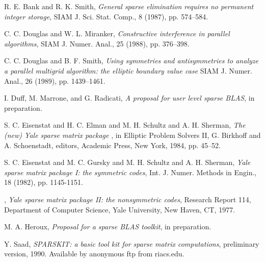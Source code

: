  

\begin{thebibliography}{99}
 
  R. E. Bank and R. K. Smith,
  {\em General sparse elimination requires no permanent integer storage},
  SIAM J. Sci. Stat. Comp., 8 (1987), pp. 574--584.
 
  C. C. Douglas and W. L. Miranker,
  {\em Constructive interference in parallel algorithms},
  SIAM J. Numer. Anal., 25 (1988), pp. 376--398.
 
  C. C. Douglas and B. F. Smith,
  {\em Using symmetries and antisymmetries to analyze a parallel
       multigrid algorithm: the elliptic boundary value case}
  SIAM J. Numer. Anal., 26 (1989), pp. 1439--1461.
 
  I. Duff, M. Marrone, and G. Radicati,
  {\em A proposal for user level sparse {BLAS}},
  in preparation.

  S. C. Eisenstat and H. C. Elman and M. H. Schultz and A. H. Sherman,
  {\em The (new) Yale sparse matrix package },
  in Elliptic Problem Solvers II, G. Birkhoff and A. Schoenstadt, editors,
  Academic Press, New York, 1984, pp. 45--52.

  S. C. Eisenstat and M. C. Gursky and M. H. Schultz and A. H. Sherman,
  {\em Yale sparse matrix package I:  the symmetric codes},
  Int. J. Numer. Methods in Engin., 18 (1982), pp. 1145-1151.

  \leavevmode\vrule height 2pt depth -1.6pt width 23pt, 
  {\em Yale sparse matrix package II:  the nonsymmetric codes},
  Research Report 114, Department of Computer Science, Yale University,
  New Haven, CT, 1977.

  M. A. Heroux,
  {\em  Proposal for a sparse {BLAS} toolkit},
  in preparation.

  Y. Saad,
  {\em {SPARSKIT}: a basic tool kit for sparse matrix computations},
  preliminary version, 1990.
  Available by anonymous ftp from riacs.edu.
\end{thebibliography}
 


